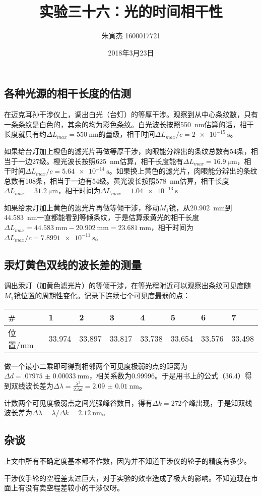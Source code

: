 \documentclass[UTF8]{ctexart}
\title{实验三十六：光的时间相干性}
\author{朱寅杰 1600017721}
\date{2018年3月23日}
\begin{document}
\maketitle
\setcounter{section}{36}
\subsection{各种光源的相干长度的估测}
在迈克耳孙干涉仪上，调出白光（台灯）的等厚干涉。观察到从中心条纹数，只有一条条纹是白色的，其余的均为彩色条纹。白光波长按照\SI{550}{\nm}估算的话，相干长度就只有约$\Delta L_{max}=\SI{550}{\nm}$的量级，相干时间$\Delta L_{max}/c=\SI{2e-15}{\s}$。

如果给台灯加上橙色的滤光片再做等厚干涉，肉眼能分辨出的条纹总数有54条，相当于一边27级。橙光波长按照\SI{625}{\nm}估算，相干长度能有$\Delta L_{max}=\SI{16.9}{\micro\meter}$，相干时间$\Delta L_{max}/c=\SI{5.64e-14}{\s}$。如果换上黄色的滤光片，肉眼能分辨出的条纹总数有108条，相当于一边有54级。黄光波长按照\SI{578}{\nm}估算，相干长度$\Delta L_{max}=\SI{31.2}{\micro\meter}$，相干时间为$\Delta L_{max}=\SI{1.04e-13}{\s}$

如果给汞灯加上黄色的滤光片再做等倾干涉，移动$M_1$镜，从\SI{20.902}{\mm}到\SI{44.583}{\nm}一直都能看到等倾条纹，于是估算汞黄光的相干长度$\Delta L_{max}=\SI{44.583}{\mm}-\SI{20.902}{\mm}=\SI{23.681}{\mm}$，相干时间为$\Delta L_{max}/c=\SI{7.8991e-11}{\s}$。

\subsection{汞灯黄色双线的波长差的测量}
调出汞灯（加黄色滤光片）的等倾干涉，在等光程附近可以观察出条纹可见度随$M_1$镜位置的周期性变化。记录下连续七个可见度最弱的点：
\begin{center}
\begin{tabu}{X[c]|X[c]X[c]X[c]X[c]X[c]X[c]X[c]}
\hline
\#	&1&2&3&4&5&6&7\\
\hline
位置/mm	&33.974	&33.897	&33.817	&33.738	&33.654	&33.576	&33.498\\
\hline
\end{tabu}
\end{center}
做一个最小二乘即可得到相邻两个可见度极弱的点的距离为$\Delta d=\SI{.07975(33)}{\mm}$，相关系数为\num{.99996}。于是用书上的公式（36.4）得到双线波长差为$\Delta\lambda=\frac{\lambda^2}{2\Delta d}=\SI{2.09(1)}{\nm}$。

计数两个可见度极弱点之间光强峰谷数目，得有$\Delta k=272$个峰出现，于是知双线波长差为$\Delta\lambda=\lambda/\Delta k=\SI{2.12}{\nm}$。

\subsection{杂谈}
上文中所有不确定度基本都不作数，因为并不知道干涉仪的轮子的精度有多少。

干涉仪手轮的空程差太过巨大，对于实验的效率造成了极大的影响。不知道现在市面上有没有卖空程差较小的干涉仪呀。
\end{document}

